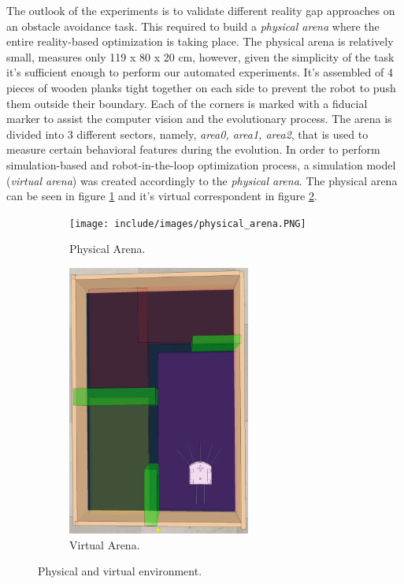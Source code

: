 The outlook of the experiments is to validate different reality gap approaches on an obstacle avoidance task. This required to build a \emph{physical arena} where the entire reality-based optimization is taking place. The physical arena is relatively small, measures only 119 x 80 x 20 cm, however, given the simplicity of the task it's sufficient enough to perform our automated experiments. It's assembled of 4 pieces of wooden planks tight together on each side to prevent the robot to push them outside their boundary. Each of the corners is marked with a fiducial marker to assist the computer vision and the evolutionary process. The arena is divided into 3 different sectors, namely, \emph{area0, area1, area2}, that is used to measure certain behavioral features during the evolution. In order to perform simulation-based and robot-in-the-loop optimization process, a simulation model (\emph{virtual arena}) was created accordingly to the \emph{physical arena}. The physical arena can be seen in figure \ref{fig:physical_arena} and it's virtual correspondent in figure \ref{fig:virtual_arena}.


\begin{figure}[H]
    \centering
    \begin{subfigure}[b]{0.4\textwidth}
    	\centering
        \texttt{[image: include/images/physical\_arena.PNG]}
        \caption{Physical Arena.}
        \label{fig:physical_arena}
    \end{subfigure}
    \begin{subfigure}[b]{0.4\textwidth}
    	\centering
        \includegraphics[width=6cm]{include/images/virtual_arena.PNG}
        \caption{Virtual Arena.}
        \label{fig:virtual_arena}
    \end{subfigure}
    \caption{Physical and virtual environment.}\label{sistemass1}
\end{figure}

